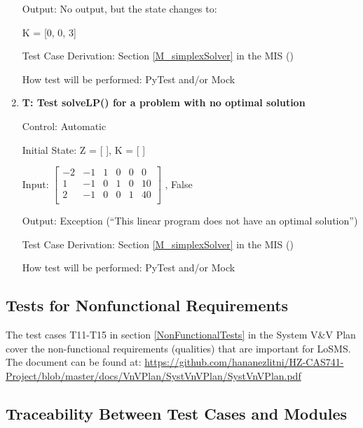 \documentclass[12pt, titlepage]{article}
\newcounter{testnum} %
\newcommand{\famname}{LoSMS}
\begin{document}
\begin{enumerate}
	Output: No output, but the state changes to:
	
	K = [0, 0, 3]
	
	Test Case Derivation: Section \ref{M_simplexSolver} in the MIS 
	(\cite{losms-mis})
	
	How test will be performed: PyTest and/or Mock
	
	\item{\textbf{T\thetestnum \label{solveLpNoSol}: 
	Test solveLP() for a problem with no optimal solution}}
	
	Control: Automatic
	
	Initial State: Z = [ ], K = [ ]
	
	Input: 	$\begin{bmatrix}
	-2 & -1 & 1 & 0 & 0 & 0\\
	1 & -1 & 0 & 1 & 0 & 10\\
	2 & -1 & 0 & 0 & 1 & 40\\
	\end{bmatrix}$ , False 
	
	Output: Exception (``This linear program does not have an optimal 
	solution'')
	
	Test Case Derivation: Section \ref{M_simplexSolver} in the MIS 
	(\cite{losms-mis})
	
	How test will be performed: PyTest and/or Mock
		
\end{enumerate}

\subsection{Tests for Nonfunctional Requirements}

The test cases T11-T15 in section \ref{NonFunctionalTests} in the System V\&V 
Plan cover the non-functional requirements (qualities) that are important for 
\famname{}. The document can be found at: 
\url{https://github.com/hananezlitni/HZ-CAS741-Project/blob/master/docs/VnVPlan/SystVnVPlan/SystVnVPlan.pdf}

\subsection{Traceability Between Test Cases and Modules}
\end{document}
